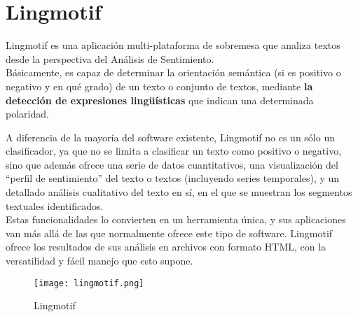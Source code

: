 
\section{Lingmotif~\cite{lingmotif}}
Lingmotif es una aplicación multi-plataforma de sobremesa que analiza textos desde la perspectiva 
del Análisis de Sentimiento. \\Básicamente, es capaz de determinar la orientación semántica 
(si es positivo o negativo y en qué grado) de un texto o conjunto de textos, mediante \textbf{la detección 
de expresiones lingüísticas} que indican una determinada polaridad.

A diferencia de la mayoría del software existente, Lingmotif no es un sólo un clasificador, 
ya que no se limita a clasificar un texto como positivo o negativo, sino que además ofrece una 
serie de datos cuantitativos, una visualización del ``perfil de sentimiento'' del texto o textos 
(incluyendo series temporales), y un detallado análisis cualitativo del texto en sí, en el que 
se muestran los segmentos textuales identificados. \\Estas funcionalidades lo convierten en un herramienta 
única, y sus aplicaciones van más allá de las que normalmente ofrece este tipo de software. 
Lingmotif ofrece los resultados de sus análisis en archivos con formato HTML, con la versatilidad y 
fácil manejo que esto supone.
\begin{figure}[h]
    \advance{} 
    \texttt{[image: lingmotif.png]}
    \caption{Lingmotif}
\end{figure}

\newpage
